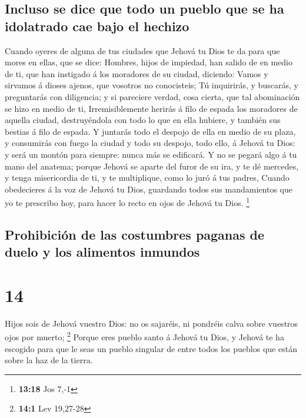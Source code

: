 \hypertarget{incluso-se-dice-que-todo-un-pueblo-que-se-ha-idolatrado-cae-bajo-el-hechizo}{%
\subsection{Incluso se dice que todo un pueblo que se ha idolatrado cae
bajo el
hechizo}\label{incluso-se-dice-que-todo-un-pueblo-que-se-ha-idolatrado-cae-bajo-el-hechizo}}

 Cuando oyeres de alguna de tus ciudades que Jehová tu
Dios te da para que mores en ellas, que se dice: 
Hombres, hijos de impiedad, han salido de en medio de ti, que han
instigado á los moradores de su ciudad, diciendo: Vamos y sirvamos á
dioses ajenos, que vosotros no conocisteis;  Tú
inquirirás, y buscarás, y preguntarás con diligencia; y si pareciere
verdad, cosa cierta, que tal abominación se hizo en medio de ti,
 Irremisiblemente herirás á filo de espada los moradores
de aquella ciudad, destruyéndola con todo lo que en ella hubiere, y
también sus bestias á filo de espada.  Y juntarás todo el
despojo de ella en medio de su plaza, y consumirás con fuego la ciudad y
todo su despojo, todo ello, á Jehová tu Dios: y será un montón para
siempre: nunca más se edificará.  Y no se pegará algo á
tu mano del anatema; porque Jehová se aparte del furor de su ira, y te
dé mercedes, y tenga misericordia de ti, y te multiplique, como lo juró
á tus padres,  Cuando obedecieres á la voz de Jehová tu
Dios, guardando todos sus mandamientos que yo te prescribo hoy, para
hacer lo recto en ojos de Jehová tu Dios. \footnote{\textbf{13:18} Jos
  7,-1}

\hypertarget{prohibiciuxf3n-de-las-costumbres-paganas-de-duelo-y-los-alimentos-inmundos}{%
\subsection{Prohibición de las costumbres paganas de duelo y los
alimentos
inmundos}\label{prohibiciuxf3n-de-las-costumbres-paganas-de-duelo-y-los-alimentos-inmundos}}

\hypertarget{section-13}{%
\section{14}\label{section-13}}

 Hijos sois de Jehová vuestro Dios: no os sajaréis, ni
pondréis calva sobre vuestros ojos por muerto; \footnote{\textbf{14:1}
  Lev 19,27-28}  Porque eres pueblo santo á Jehová tu
Dios, y Jehová te ha escogido para que le seas un pueblo singular de
entre todos los pueblos que están sobre la haz de la tierra.

